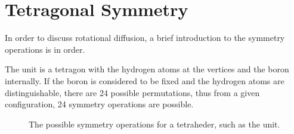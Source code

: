 \section{Tetragonal Symmetry}
\label{sec:symmetry}
In order to discuss rotational diffusion, a brief introduction to the  symmetry operations is in order.

The  unit is a tetragon with the hydrogen atoms at the vertices and the boron internally.
If the boron is considered to be fixed and the hydrogen atoms are distinguishable, there are 24 possible permutations, thus from a given configuration, 24 symmetry operations are possible.

\begin{figure}[h!]
  \begin{center}
\newline
    \parbox{0.85\linewidth}{
      \caption{The possible symmetry operations for a tetraheder, such as the  unit.
      }
      \label{fig:symmetry}
    }
  \end{center}
\end{figure}

